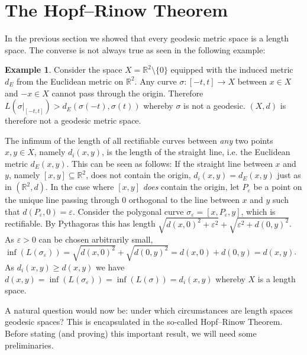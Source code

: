 \documentclass[11pt, a4paper, oneside]{memoir}
\theoremstyle{plain}\newtheorem{theorem}[subsection]{Theorem}
\theoremstyle{definition}
\newtheorem{example}[subsection]{Example}
\newcommand{\R}{\mathbb{R}}
\begin{document}
\section{The Hopf--Rinow Theorem}
In the previous section we showed that every geodesic metric space is a length space.
The converse is not always true as seen in the following example:
\begin{example}
Consider the space \(X=\R^2\setminus\{0\}\) equipped with the induced metric \(d_E\) from the Euclidean metric on \(\R^2\).
Any curve \(\sigma:[-t,t]\to X\) between \(x\in X\) and \(-x\in X\) cannot pass through the origin. 
Therefore \(L(\sigma|_{[-t,t]})>d_E(\sigma(-t),\sigma(t))\) whereby \(\sigma\) is not a geodesic. 
\((X,d)\) is therefore not a geodesic metric space.

The infimum of the length of all rectifiable curves between \emph{any} two points \(x,y\in X\), namely \(d_i(x,y)\), is the length of the straight line, i.e. the Euclidean metric \(d_E(x,y)\). 
This can be seen as follows:
If the straight line between \(x\) and \(y\), namely \([x,y]\subseteq\R^2\), does not contain the origin, \(d_i(x,y)=d_E(x,y)\) just as in \((\R^2,d)\). 
In the case where \([x,y]\) \emph{does} contain the origin, let \(P_\varepsilon\) be a point on the unique line passing through \(0\) orthogonal to the line between \(x\) and \(y\) such that \(d(P_\varepsilon,0)=\varepsilon\).
Consider the polygonal curve \(\sigma_\varepsilon=[x,P_\varepsilon,y]\), which is rectifiable.
By Pythagoras this has length \(\sqrt{d(x,0)^2+\varepsilon^2}+\sqrt{\varepsilon^2+d(0,y)^2}\).
As \(\varepsilon>0\) can be chosen arbitrarily small, \(\inf(L(\sigma_\varepsilon))=\sqrt{d(x,0)^2}+\sqrt{d(0,y)^2}=d(x,0)+d(0,y)=d(x,y)\).
As \(d_i(x,y)\geq d(x,y)\) we have \(d(x,y)=\inf(L(\sigma_\varepsilon))=\inf(L(\sigma))=d_i(x,y)\) whereby \(X\) is a length space.
\end{example}

A natural question would now be: under which circumstances are length spaces geodesic spaces?
This is encapsulated in the so-called Hopf--Rinow Theorem. 
Before stating (and proving) this important result, we will need some preliminaries.
\end{document}
